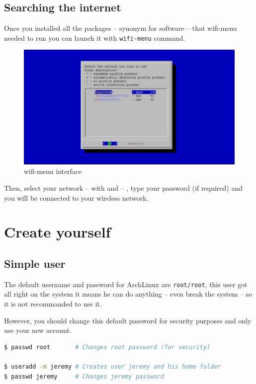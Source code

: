 \subsection{Searching the internet}
Once you installed all the packages -- synonym for software -- that wifi-menu 
needed to run you can launch it with \og{}\texttt{wifi-menu}\fg{} command.

\begin{figure}[h]
	\centering
	\includegraphics[scale=0.3]{images/WifiMenu.png}
	\caption{wifi-menu interface}
	\label{figure:WifiMenu}
\end{figure}

Then, select your network -- with \keys{\arrowkeyup} and \keys{\arrowkeydown} -- 
, type your password (if required) and you will be connected to your wireless 
network.
\newpage
\section{Create yourself}
\subsection{Simple user}\label{subsec:SimpleUser}
The default username and password for ArchLinux are \texttt{root/root}, this 
user got all right on the system it means he can do anything -- even break the 
system -- so it is not recommanded to use it. 

However, you should change this default password for security purposes and only 
use your new account.
\\
\begin{lstlisting}[language=bash,caption=Create a new user called jeremy]
$ passwd root       # Changes root password (for security)

$ useradd -m jeremy # Creates user jeremy and his home folder
$ passwd jeremy     # Changes jeremy password
\end{lstlisting}

